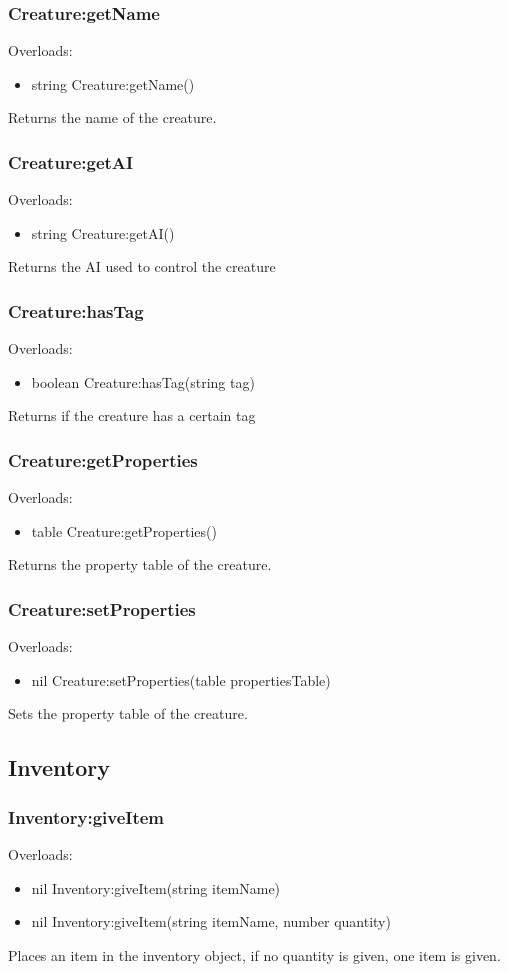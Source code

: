 \documentclass{book}
\newenvironment{ulist}
	{\begin{itemize}
			\itemsep0em}
	{\end{itemize}}
\begin{document}
\subsubsection{Creature:getName}
Overloads:
\begin{ulist}
	\item string Creature:getName()
\end{ulist}
Returns the name of the creature.

\subsubsection{Creature:getAI}
Overloads:
\begin{ulist}
	\item string Creature:getAI()
\end{ulist}
Returns the AI used to control the creature

\subsubsection{Creature:hasTag}
Overloads:
\begin{ulist}
	\item boolean Creature:hasTag(string tag)
\end{ulist}
Returns if the creature has a certain tag

\subsubsection{Creature:getProperties}
Overloads:
\begin{ulist}
	\item table Creature:getProperties()
\end{ulist}
Returns the property table of the creature.

\subsubsection{Creature:setProperties}
Overloads:
\begin{ulist}
	\item nil Creature:setProperties(table propertiesTable)
\end{ulist}
Sets the property table of the creature.

\subsection{Inventory}
\subsubsection{Inventory:giveItem}
Overloads:
\begin{ulist}
	\item nil Inventory:giveItem(string itemName)
	\item nil Inventory:giveItem(string itemName, number quantity)
\end{ulist}
Places an item in the inventory object, if no quantity is given, one item is given.
\end{document}
